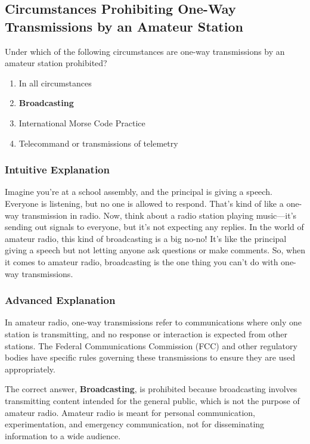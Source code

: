 \subsection{Circumstances Prohibiting One-Way Transmissions by an Amateur Station}
\label{T1D02}

\begin{tcolorbox}[colback=gray!10!white,colframe=black!75!black,title=T1D02]
Under which of the following circumstances are one-way transmissions by an amateur station prohibited?
\begin{enumerate}[label=\Alph*]
    \item In all circumstances
    \item \textbf{Broadcasting}
    \item International Morse Code Practice
    \item Telecommand or transmissions of telemetry
\end{enumerate}
\end{tcolorbox}

\subsubsection{Intuitive Explanation}
Imagine you're at a school assembly, and the principal is giving a speech. Everyone is listening, but no one is allowed to respond. That's kind of like a one-way transmission in radio. Now, think about a radio station playing music—it's sending out signals to everyone, but it's not expecting any replies. In the world of amateur radio, this kind of broadcasting is a big no-no! It's like the principal giving a speech but not letting anyone ask questions or make comments. So, when it comes to amateur radio, broadcasting is the one thing you can't do with one-way transmissions.

\subsubsection{Advanced Explanation}
In amateur radio, one-way transmissions refer to communications where only one station is transmitting, and no response or interaction is expected from other stations. The Federal Communications Commission (FCC) and other regulatory bodies have specific rules governing these transmissions to ensure they are used appropriately.

The correct answer, \textbf{Broadcasting}, is prohibited because broadcasting involves transmitting content intended for the general public, which is not the purpose of amateur radio. Amateur radio is meant for personal communication, experimentation, and emergency communication, not for disseminating information to a wide audience.

